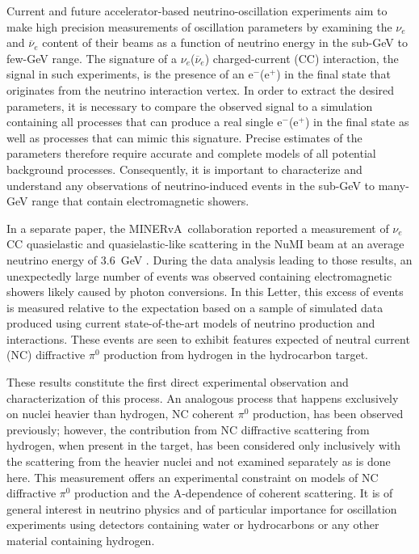 \documentclass[%
preprint,
 amsmath,amssymb,
 aps,
]{revtex4-1}
\newcommand{\minerva}{\mbox{MINERvA}}
\newcommand{\nuebar}[0]{\overline{\nu}_{e}}
\newcommand{\nue}[0]{\nu_{e}}
\begin{document}
Current and future accelerator-based neutrino-oscillation experiments aim to make high precision measurements of oscillation parameters by examining the $\nue$ and $\nuebar$ content of their beams as a function of neutrino energy in the sub-GeV to few-GeV range\cite{NOvATDR,T2KNIM,dune,SBN,hyperk}.  The  signature of a $\nue$($\nuebar$) charged-current (CC) interaction, the signal in such experiments, is the presence of an e$^{-}$(e$^{+}$) in the final state that originates from the neutrino interaction vertex.  In order to extract the desired parameters, it is necessary to compare the observed signal to a simulation containing all processes that can produce a real single e$^{-}$(e$^{+}$) in the final state as well as processes that can mimic this signature.  Precise estimates of the parameters therefore require accurate and complete models of all potential background processes.  Consequently, it is important to characterize and understand any observations of neutrino-induced events in the sub-GeV to many-GeV range that contain electromagnetic showers. 

In a separate paper, the \minerva\ collaboration reported a measurement of $\nue$ CC quasielastic and quasielastic-like scattering in the NuMI beam at an average neutrino energy of 3.6~GeV \cite{minervaNueCCQE}. During the data analysis leading to those results, an unexpectedly large number of events was observed containing electromagnetic showers likely caused by photon conversions.  In this Letter, this excess of events is measured relative to the expectation based on a sample of simulated data produced using current state-of-the-art models of neutrino production and interactions. These events are seen to exhibit features expected of neutral current (NC) diffractive  $\pi^{0}$ production from hydrogen in the hydrocarbon target. 

These results constitute the first direct experimental observation and characterization of this process.  An analogous process that happens exclusively on nuclei heavier than hydrogen, NC coherent $\pi^{0}$ production, has been observed previously\cite{Faissner1983,Isiksal1984,Bergsma1985,Grabosch1986,Baltay1986,miniboone2008,nomad2009,sciboone2010}; however, the contribution from NC diffractive scattering from hydrogen, when present in the target, has been considered only inclusively with the scattering from the heavier nuclei and not examined separately as is done here.
This measurement offers an experimental constraint on models of NC diffractive $\pi^{0}$ production and the A-dependence of coherent scattering. It is of general interest in neutrino physics and of particular importance for oscillation experiments using detectors containing water or hydrocarbons or any other material containing hydrogen. 
\end{document}
